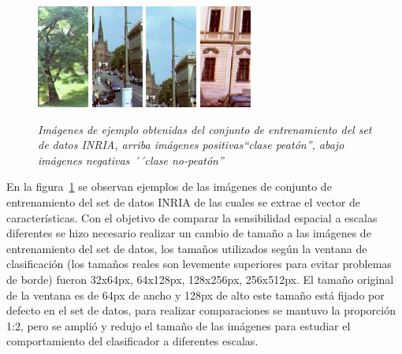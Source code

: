 \begin{figure}[htc]
  \includegraphics[scale=.9]{images/neg2}
  \includegraphics[scale=.9]{images/neg3}
  \includegraphics[scale=.9]{images/neg4}
  \includegraphics[scale=.9]{images/neg5}
  \caption{\em Imágenes de ejemplo obtenidas del conjunto de entrenamiento del set de datos INRIA, arriba imágenes positivas``clase peatón'', abajo imágenes negativas ´´clase no-peatón'' }  
  \label{fig:trainimgs}
\end{figure}

En la figura~\ref{fig:trainimgs} se observan ejemplos de las imágenes de conjunto de entrenamiento del set de datos INRIA de las cuales se extrae el vector de características. Con el objetivo de comparar la sensibilidad espacial a escalas diferentes se hizo necesario realizar un cambio de tamaño a las imágenes de entrenamiento del set de datos, los tamaños utilizados según la ventana de clasificación (los tamaños reales son levemente superiores para evitar problemas de borde) fueron 32x64px, 64x128px, 128x256px, 256x512px. El tamaño original de la ventana es de 64px de ancho y 128px de alto este tamaño está fijado por defecto en el set de datos, para realizar comparaciones se mantuvo la proporción 1:2, pero se amplió y redujo el tamaño de las imágenes para estudiar el comportamiento del clasificador a diferentes escalas.


